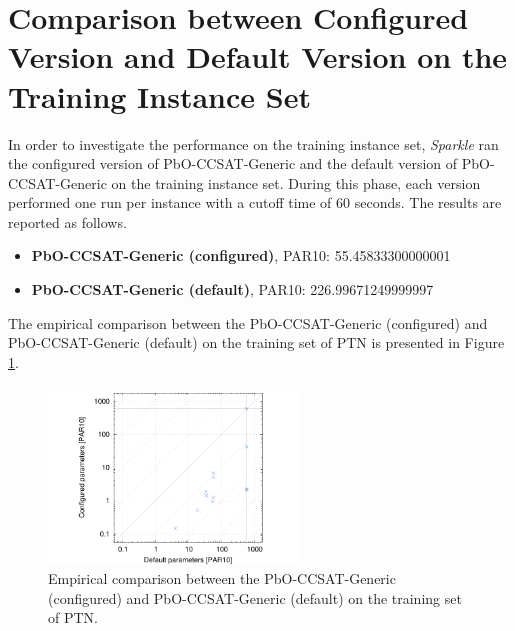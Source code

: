 \documentclass[british]{article}
\begin{document}
\vspace{5mm}


\section{Comparison between Configured Version and Default Version on the Training Instance Set}
In order to investigate the performance on the training instance set, \emph{Sparkle} ran the configured version of PbO-CCSAT-Generic and the default version of PbO-CCSAT-Generic on the training instance set. During this phase, each version performed one run per instance with a cutoff time of 60 seconds. The results are reported as follows.

\begin{itemize}
    \item \textbf{PbO-CCSAT-Generic (configured)}, PAR10: 55.45833300000001
    \item \textbf{PbO-CCSAT-Generic (default)}, PAR10: 226.99671249999997
\end{itemize}

The empirical comparison between the PbO-CCSAT-Generic (configured) and PbO-CCSAT-Generic (default) on the training set of PTN is presented in Figure \ref{fig:configured_vs_default_train}.

\begin{figure}[htbp]
\noindent \begin{centering}
\includegraphics[width=0.6\textwidth]{data_PbO-CCSAT-Generic_configured_vs_default_on_PTN_train}
\par\end{centering}

\caption{Empirical comparison between the PbO-CCSAT-Generic (configured) and PbO-CCSAT-Generic (default) on the training set of PTN.}\label{fig:configured_vs_default_train}
\end{figure}
\end{document}
